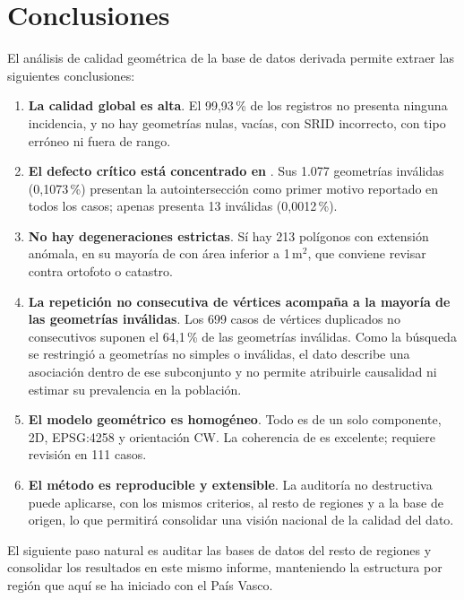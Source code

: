 \chapter{Conclusiones}
\label{ch:conclusiones}

El análisis de calidad geométrica de la base de datos derivada permite extraer las siguientes conclusiones:

\begin{enumerate}[leftmargin=1.5em]
	\item \textbf{La calidad global es alta}. El 99,93\,\% de los registros no presenta ninguna incidencia, y no hay geometrías nulas, vacías, con SRID incorrecto, con tipo erróneo ni fuera de rango.
	\item \textbf{El defecto crítico está concentrado en }. Sus 1.077 geometrías inválidas (0,1073\,\%) presentan la autointersección como primer motivo reportado en todos los casos;  apenas presenta 13 inválidas (0,0012\,\%).
	\item \textbf{No hay degeneraciones estrictas}. Sí hay 213 polígonos con extensión anómala, en su mayoría de  con área inferior a 1\,m$^{2}$, que conviene revisar contra ortofoto o catastro.
	\item \textbf{La repetición no consecutiva de vértices acompaña a la mayoría de las geometrías inválidas}. Los 699 casos de vértices duplicados no consecutivos suponen el 64,1\,\% de las geometrías inválidas. Como la búsqueda se restringió a geometrías no simples o inválidas, el dato describe una asociación dentro de ese subconjunto y no permite atribuirle causalidad ni estimar su prevalencia en la población.
	\item \textbf{El modelo geométrico es homogéneo}. Todo es  de un solo componente, 2D, EPSG:4258 y orientación CW. La coherencia de  es excelente;  requiere revisión en 111 casos.
	\item \textbf{El método es reproducible y extensible}. La auditoría no destructiva puede aplicarse, con los mismos criterios, al resto de regiones y a la base de origen, lo que permitirá consolidar una visión nacional de la calidad del dato.
\end{enumerate}

El siguiente paso natural es auditar las bases de datos del resto de regiones y consolidar los resultados en este mismo informe, manteniendo la estructura por región que aquí se ha iniciado con el País Vasco.
